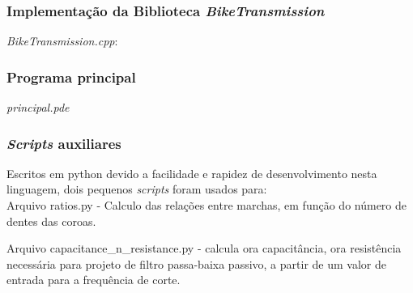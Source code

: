 \documentclass[a4paper,11pt]{article}
\begin{document}
\subsubsection{Implementação da Biblioteca \textit{BikeTransmission}}
\label{code:impl}
\textit{BikeTransmission.cpp}:


\subsubsection{Programa principal}
\label{code:main}
\textit{principal.pde}


\subsubsection{\textit{Scripts} auxiliares}
\label{code:helper_scripts}


Escritos em python\cite{python} devido a facilidade e rapidez de desenvolvimento nesta linguagem, dois pequenos \textit{scripts} foram usados para: \\
Arquivo ratios.py - Calculo das relações entre marchas, em função do número de dentes das coroas.


Arquivo capacitance\_n\_resistance.py - calcula ora capacitância, ora resistência necessária para projeto de filtro passa-baixa passivo, a partir de um valor de entrada para a frequência de corte.

\label{code:lowpass}



\pagebreak
%


\end{document}
